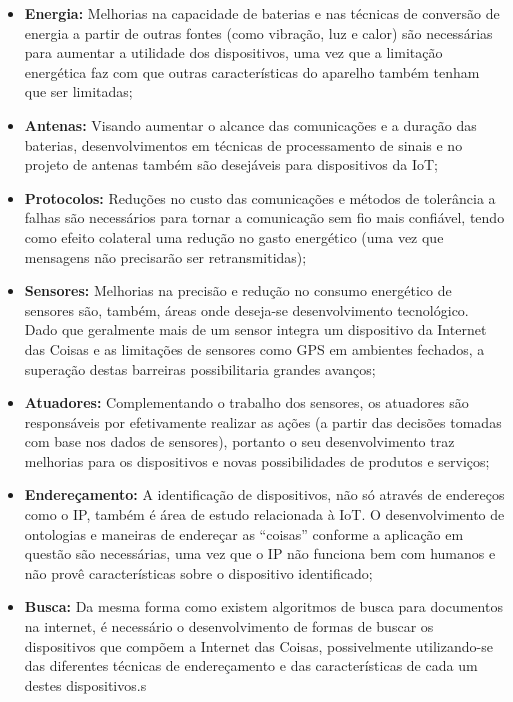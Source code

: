 \documentclass[twoside,english,brazilian]{UNISINOSmonografia}
\begin{document}
\begin{itemize}
	
	\item \textbf{Energia:}
Melhorias na capacidade de baterias e nas técnicas de conversão de energia a 
partir de outras fontes (como vibração, luz e calor) são necessárias para 
aumentar a utilidade dos dispositivos, uma vez que a limitação energética faz 
com que outras características do aparelho também tenham que ser limitadas;
	
	\item \textbf{Antenas:}
Visando aumentar o alcance das comunicações e a duração das baterias, 
desenvolvimentos em técnicas de processamento de sinais e no projeto de 
antenas também são desejáveis para dispositivos da IoT;
	
	\item \textbf{Protocolos:}
Reduções no custo das comunicações e métodos de tolerância a falhas são 
necessários para tornar a comunicação sem fio mais confiável, tendo como 
efeito colateral uma redução no gasto energético (uma vez que mensagens não 
precisarão ser retransmitidas);
	
	\item \textbf{Sensores:}
Melhorias na precisão e redução no consumo energético de sensores são, também, 
áreas onde deseja-se desenvolvimento tecnológico. Dado que geralmente mais de 
um sensor integra um dispositivo da Internet das Coisas e as limitações de 
sensores como GPS em ambientes fechados, a superação destas barreiras 
possibilitaria grandes avanços;
	
	\item \textbf{Atuadores:}
Complementando o trabalho dos sensores, os atuadores são responsáveis por 
efetivamente realizar as ações (a partir das decisões tomadas com base nos 
dados de sensores), portanto o seu desenvolvimento traz melhorias para os 
dispositivos e novas possibilidades de produtos e serviços;
	
	\item \textbf{Endereçamento:}
A identificação de dispositivos, não só através de endereços como o IP, também 
é área de estudo relacionada à IoT. O desenvolvimento de ontologias e maneiras 
de endereçar as ``coisas'' conforme a aplicação em questão são necessárias, 
uma vez que o IP não funciona bem com humanos e não provê características 
sobre o dispositivo identificado;
	
	\item \textbf{Busca:}
Da mesma forma como existem algoritmos de busca para documentos na internet, 
é necessário o desenvolvimento de formas de buscar os dispositivos que compõem 
a Internet das Coisas, possivelmente utilizando-se das diferentes técnicas de 
endereçamento e das características de cada um destes dispositivos.s
	
\end{itemize}
\end{document}
